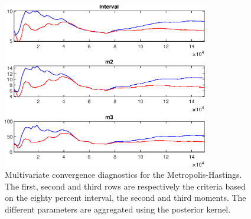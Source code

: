  
\begin{figure}[H]
\centering 
\includegraphics[width=0.8\textwidth]{BRS_imp_mobility_est/Output/BRS_imp_mobility_est_mdiag}
\caption{Multivariate convergence diagnostics for the Metropolis-Hastings.
The first, second and third rows are respectively the criteria based on
the eighty percent interval, the second and third moments. The different 
parameters are aggregated using the posterior kernel.}\label{Fig:MultivariateDiagnostics}
\end{figure}

